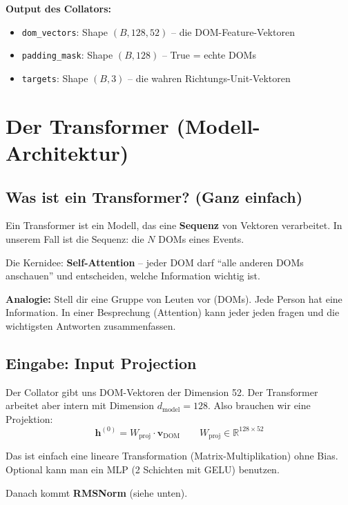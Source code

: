 \documentclass[12pt, a4paper]{article}
\begin{document}
\textbf{Output des Collators:}
\begin{itemize}
    \item \texttt{dom\_vectors}: Shape $(B, 128, 52)$ -- die DOM-Feature-Vektoren
    \item \texttt{padding\_mask}: Shape $(B, 128)$ -- True = echte DOMs
    \item \texttt{targets}: Shape $(B, 3)$ -- die wahren Richtungs-Unit-Vektoren
\end{itemize}


\newpage
\section{Der Transformer (Modell-Architektur)}

\subsection{Was ist ein Transformer? (Ganz einfach)}

Ein Transformer ist ein Modell, das eine \textbf{Sequenz} von Vektoren
verarbeitet. In unserem Fall ist die Sequenz: die $N$ DOMs eines Events.

Die Kernidee: \textbf{Self-Attention} -- jeder DOM darf ``alle anderen DOMs
anschauen'' und entscheiden, welche Information wichtig ist.

\textbf{Analogie:} Stell dir eine Gruppe von Leuten vor (DOMs). Jede Person
hat eine Information. In einer Besprechung (Attention) kann jeder jeden
fragen und die wichtigsten Antworten zusammenfassen.

\subsection{Eingabe: Input Projection}

Der Collator gibt uns DOM-Vektoren der Dimension 52. Der Transformer arbeitet
aber intern mit Dimension $d_\text{model} = 128$. Also brauchen wir eine
Projektion:
\[
    \mathbf{h}^{(0)} = W_\text{proj} \cdot \mathbf{v}_\text{DOM} \qquad
    W_\text{proj} \in \mathbb{R}^{128 \times 52}
\]

Das ist einfach eine lineare Transformation (Matrix-Multiplikation) ohne Bias.
Optional kann man ein MLP (2 Schichten mit GELU) benutzen.

Danach kommt \textbf{RMSNorm} (siehe unten).
\end{document}
